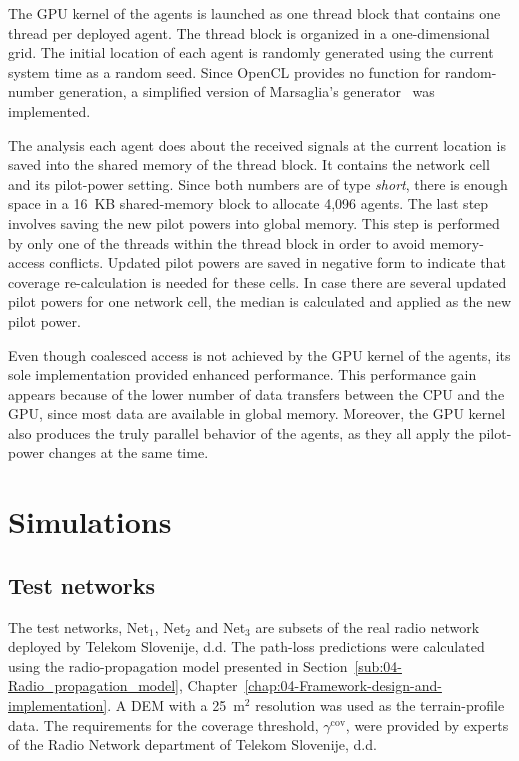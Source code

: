 The GPU kernel of the agents is launched as one thread block that
contains one thread per deployed agent. The thread block is organized
in a one-dimensional grid. The initial location of each agent is randomly
generated using the current system time as a random seed. Since OpenCL
provides no function for random-number generation, a simplified version
of Marsaglia's generator~\cite{Marsaglia_Seeds.for.random.number.generator:2003}
was implemented.

The analysis each agent does about the received signals at the current
location is saved into the shared memory of the thread block. It contains
the network cell and its pilot-power setting. Since both numbers are
of type \emph{short}, there is enough space in a 16~KB shared-memory
block to allocate 4,096 agents. The last step involves saving the
new pilot powers into global memory. This step is performed by only
one of the threads within the thread block in order to avoid memory-access
conflicts. Updated pilot powers are saved in negative form to indicate
that coverage re-calculation is needed for these cells. In case there
are several updated pilot powers for one network cell, the median
is calculated and applied as the new pilot power.

Even though coalesced access is not achieved by the GPU kernel of
the agents, its sole implementation provided enhanced performance.
This performance gain appears because of the lower number of data
transfers between the CPU and the GPU, since most data are available
in global memory. Moreover, the GPU kernel also produces the truly
parallel behavior of the agents, as they all apply the pilot-power
changes at the same time.


\section{Simulations \label{sec:06-Simulations}}


\subsection{Test networks}

The test networks, Net$_{1}$, Net$_{2}$ and Net$_{3}$ are subsets
of the real radio network deployed by Telekom Slovenije, d.d. The
path-loss predictions were calculated using the radio-propagation
model presented in Section~\ref{sub:04-Radio_propagation_model},
Chapter~\ref{chap:04-Framework-design-and-implementation}. A DEM
with a 25~m$^{2}$ resolution was used as the terrain-profile data.
The requirements for the coverage threshold, $\gamma^{\mathrm{cov}}$,
were provided by experts of the Radio Network department of Telekom
Slovenije, d.d.

